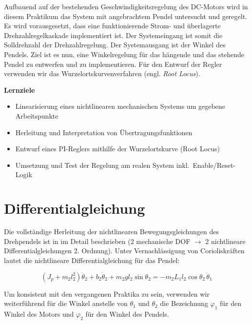 \documentclass[a4paper,11pt]{scrartcl}
\begin{document}
\makelabtitle

Aufbauend auf der bestehenden Geschwindigkeitsregelung des DC-Motors wird in diesem Praktikum das System mit angebrachtem Pendel untersucht und geregelt. Es wird vorausgesetzt, dass eine funktionierende Strom- und überlagerte Drehzahlregelkaskade implementiert ist. Der Systemeingang ist somit die Solldrehzahl der Drehzahlregelung. Der Systemausgang ist der Winkel des Pendels. Ziel ist es nun, eine Winkelregelung für das hängende und das stehende Pendel zu entwerfen und zu implementieren. Für den Entwurf der Regler verwenden wir das Wurzelortskurvenverfahren (engl. \emph{Root Locus}).

\textbf{Lernziele}
\begin{itemize}
    \item Linearisierung eines nichtlinearen mechanischen Systems um gegebene Arbeitspunkte
    \item Herleitung und Interpretation von Übertragungsfunktionen
    \item Entwurf eines PI-Reglers mithilfe der Wurzelortskurve (Root Locus)
    \item Umsetzung und Test der Regelung am realen System inkl.\ Enable/Reset-Logik
\end{itemize}

\section{Differentialgleichung}


Die vollständige Herleitung der nichtlinearen Bewegungsgleichungen des Drehpendels ist in \cite{Cazzolato2011Furuta} im Detail beschrieben (2 mechanische DOF $\rightarrow$ 2 nichtlineare Differentialgleichungen 2. Ordnung). Unter Vernachlässigung von Corioliskräften lautet die nichtlineare Differentialgleichung für das Pendel:

\[
    \left(J_p + m_2 l_2^2\right)\ddot{\theta}_2
    + b_2\dot{\theta}_2
    + m_2 g l_2 \sin\theta_2
    = -m_2 L_1 l_2 \cos\theta_2\,\ddot{\theta}_1
\]

Um konsistent mit den vergangenen Praktika zu sein, verwenden wir weiterführend für die Winkel anstelle von $\theta_1$ und $\theta_2$ die Bezeichnung $\varphi_1$ für den Winkel des Motors und $\varphi_2$ für den Winkel des Pendels.
\end{document}
